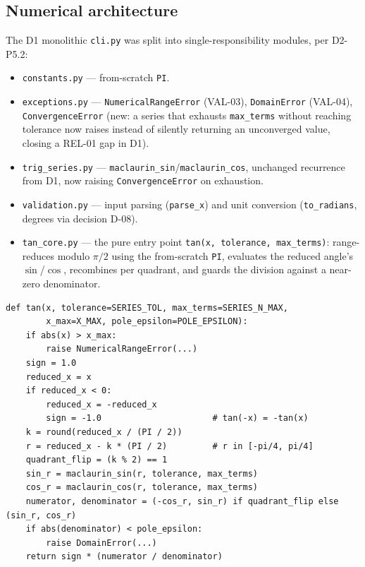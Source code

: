 \documentclass[11pt]{article}
\begin{document}
\subsection{Numerical architecture}

The D1 monolithic \texttt{cli.py} was split into single-responsibility modules, per D2-P5.2:

\begin{itemize}
  \item \texttt{constants.py} --- from-scratch \texttt{PI}.
  \item \texttt{exceptions.py} --- \texttt{NumericalRangeError} (VAL-03), \texttt{DomainError} (VAL-04), \texttt{ConvergenceError} (new: a series that exhausts \texttt{max\_terms} without reaching tolerance now raises instead of silently returning an unconverged value, closing a REL-01 gap in D1).
  \item \texttt{trig\_series.py} --- \texttt{maclaurin\_sin}/\texttt{maclaurin\_cos}, unchanged recurrence from D1, now raising \texttt{ConvergenceError} on exhaustion.
  \item \texttt{validation.py} --- input parsing (\texttt{parse\_x}) and unit conversion (\texttt{to\_radians}, degrees via decision D-08).
  \item \texttt{tan\_core.py} --- the pure entry point \texttt{tan(x, tolerance, max\_terms)}: range-reduces modulo $\pi/2$ using the from-scratch \texttt{PI}, evaluates the reduced angle's $\sin$/$\cos$, recombines per quadrant, and guards the division against a near-zero denominator.
\end{itemize}

\begin{lstlisting}[style=code,caption={Pure core entry point, src/tan\_core.py (excerpt)},label={lst:tan-core}]
def tan(x, tolerance=SERIES_TOL, max_terms=SERIES_N_MAX,
        x_max=X_MAX, pole_epsilon=POLE_EPSILON):
    if abs(x) > x_max:
        raise NumericalRangeError(...)
    sign = 1.0
    reduced_x = x
    if reduced_x < 0:
        reduced_x = -reduced_x
        sign = -1.0                      # tan(-x) = -tan(x)
    k = round(reduced_x / (PI / 2))
    r = reduced_x - k * (PI / 2)         # r in [-pi/4, pi/4]
    quadrant_flip = (k % 2) == 1
    sin_r = maclaurin_sin(r, tolerance, max_terms)
    cos_r = maclaurin_cos(r, tolerance, max_terms)
    numerator, denominator = (-cos_r, sin_r) if quadrant_flip else (sin_r, cos_r)
    if abs(denominator) < pole_epsilon:
        raise DomainError(...)
    return sign * (numerator / denominator)
\end{lstlisting}
\end{document}
